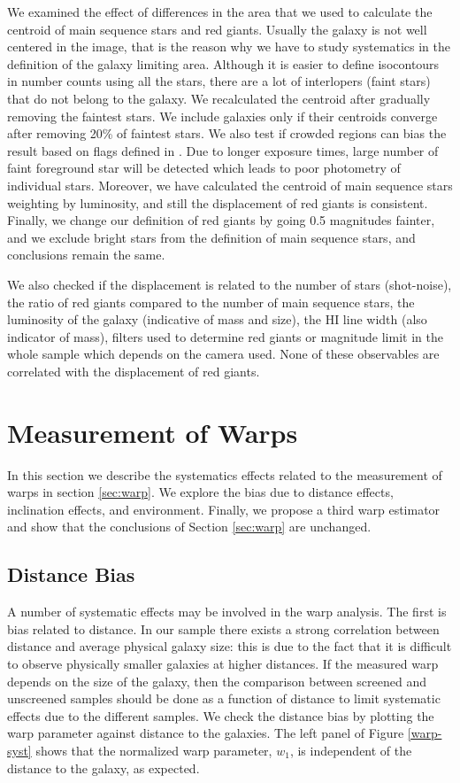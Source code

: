 \documentclass{emulateapj}
\begin{document}
We examined the effect of differences in
the area that we used to calculate the centroid of main sequence stars and red
giants. Usually the galaxy is not well centered in the image, that is the
reason why we have to study systematics in the definition of 
the galaxy limiting area. Although it is easier to define isocontours in
number counts using all the stars, there are a lot of interlopers (faint stars)
that do not belong to the galaxy. We recalculated the centroid
after gradually removing the faintest stars. We include galaxies only if their
centroids converge after removing 20\% of faintest stars.
We also test if crowded regions can bias the result based on flags defined in
\citet{dalcanton09}. Due to longer exposure times, large number of faint
foreground star will be detected which leads to poor photometry of individual
stars. Moreover, we have calculated the centroid of main sequence stars
weighting by luminosity, and still the displacement of red giants is consistent.
Finally, we change our definition of red giants by going 0.5
magnitudes fainter, and we exclude bright stars from the definition of
main sequence stars, and conclusions remain the same. 


We also checked if the displacement is related to the number of stars
(shot-noise), the ratio of red giants compared to the number of main sequence
stars,
the luminosity of the galaxy (indicative of mass and size),  the HI line
width (also indicator of mass), filters used to determine red giants or
magnitude limit in the whole sample which depends on the
camera used. None of these observables are correlated with the
displacement of red giants.


\section{Measurement of Warps}
\label{ap:warp}
In this section we describe the systematics effects related to the measurement of warps in
section \ref{sec:warp}.
We explore the bias due to distance effects, inclination effects,
and environment.  Finally, we propose a third warp estimator
and show that the conclusions of Section \ref{sec:warp} are unchanged.
 
\subsection{Distance Bias}
\label{ap:distance-systematic}
A number of systematic effects may be involved in the warp analysis.
The first is bias related to distance.
In our sample there exists a strong correlation between
distance and average physical galaxy size:
this is due to the fact that it is difficult to observe physically
smaller galaxies at higher distances. If the measured warp depends on the
size of the galaxy, then the comparison between screened and unscreened
samples should be done as a function of distance to limit systematic effects
due to the different samples.
We check the distance bias by plotting the warp parameter against
distance to the galaxies. The left panel of Figure \ref{warp-syst} shows that
the normalized warp parameter, $w_1$, is independent of the distance to
the galaxy, as expected.
\end{document}
